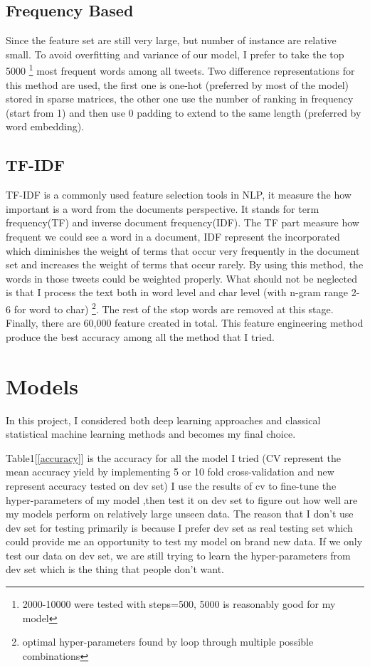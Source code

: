 \documentclass[11pt]{article}
\begin{document}
\subsection{Frequency Based}
Since the feature set are still very large, but number of instance
are relative small. To avoid overfitting and variance of our model, 
I prefer to take the top 5000
\footnote{2000-10000 were tested with steps=500, 5000 is reasonably good
for my model}
most frequent words among all tweets. 
Two difference representations for this method are
used, the first one is one-hot (preferred by most of the model) stored in 
sparse matrices, the other one use the number of ranking in frequency 
(start from 1) and then use 
0 padding to extend to the same length (preferred by word embedding).

\subsection{TF-IDF}
TF-IDF is a commonly used feature selection tools in NLP, it measure
the how important is a word from the documents perspective. It stands for
term frequency(TF) and inverse document frequency(IDF).
The TF part measure how frequent we could see a word in a document, 
IDF represent the incorporated which diminishes the weight of terms that 
occur very frequently in the document set and increases the 
weight of terms that occur rarely.
By using this method, the words in those tweets could be weighted
properly. What should not be neglected is that I process the text both
in word level and char level (with n-gram range 2-6 for word to char)
\footnote{optimal hyper-parameters found by loop through multiple
possible combinations}. The rest of the stop words are removed at this
stage. Finally, there are 60,000 feature created in total. This feature 
engineering method produce the best accuracy among all the method that
I tried.

\section{Models}
\label{models}
In this project, I considered both deep learning approaches and 
classical statistical machine learning methods and becomes my final
choice.

Table1[\ref{accuracy}] is
the accuracy for all the model I tried (CV represent the mean accuracy
yield by implementing 5 or 10 fold cross-validation and new represent 
accuracy tested on dev set)
I use the results of cv to fine-tune the hyper-parameters of my model 
,then test it on dev set to figure out how well are my models perform
on relatively large unseen data. The reason that I don't use dev set for
testing primarily is because I prefer dev set as real testing set which 
could provide me an opportunity to test my model on brand new data. If 
we only test our data on dev set, we are still trying to learn the
hyper-parameters from dev set which is the thing that people don't want.
\end{document}
